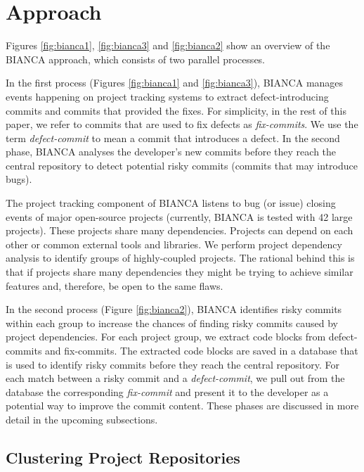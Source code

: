 \documentclass[12pt]{report}
\begin{document}
\section{Approach}\label{approach-2}

Figures \ref{fig:bianca1}, \ref{fig:bianca3} and \ref{fig:bianca2} show
an overview of the BIANCA approach, which consists of two parallel
processes.

In the first process (Figures \ref{fig:bianca1} and \ref{fig:bianca3}),
BIANCA manages events happening on project tracking systems to extract
defect-introducing commits and commits that provided the fixes. For
simplicity, in the rest of this paper, we refer to commits that are used
to fix defects as \emph{fix-commits}. We use the term
\emph{defect-commit} to mean a commit that introduces a defect. In the
second phase, BIANCA analyses the developer's new commits before they
reach the central repository to detect potential risky commits (commits
that may introduce bugs).



The project tracking component of BIANCA listens to bug (or issue)
closing events of major open-source projects (currently, BIANCA is
tested with 42 large projects). These projects share many dependencies.
Projects can depend on each other or common external tools and
libraries. We perform project dependency analysis to identify groups of
highly-coupled projects. The rational behind this is that if projects
share many dependencies they might be trying to achieve similar features
and, therefore, be open to the same flaws.

In the second process (Figure \ref{fig:bianca2}), BIANCA identifies
risky commits within each group to increase the chances of finding risky
commits caused by project dependencies. For each project group, we
extract code blocks from defect-commits and fix-commits. The extracted
code blocks are saved in a database that is used to identify risky
commits before they reach the central repository. For each match between
a risky commit and a \emph{defect-commit}, we pull out from the database
the corresponding \emph{fix-commit} and present it to the developer as a
potential way to improve the commit content. These phases are discussed
in more detail in the upcoming subsections.

\subsection{Clustering Project Repositories}\label{sec:clustering}
\end{document}

